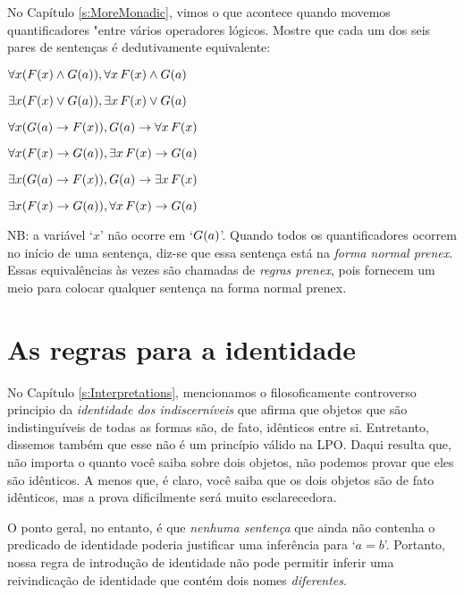 \problempart
No Capítulo \ref{s:MoreMonadic}, vimos o que acontece quando movemos quantificadores "entre  v\'arios operadores l\'ogicos. Mostre que cada um dos seis pares de senten\c cas \'e dedutivamente equivalente:
\begin{earg}
\item $\forall x(\mathord{F}(x) \wedge \mathord{G}(a)), \forall x\,\mathord{F}(x) \wedge \mathord{G}(a)$
\item $\exists x(\mathord{F}(x) \vee \mathord{G}(a)), \exists x\,\mathord{F}(x) \vee \mathord{G}(a)$
\item $\forall x(\mathord{G}(a) \rightarrow \mathord{F}(x)), \mathord{G}(a) \rightarrow \forall x\,\mathord{F}(x)$
\item $\forall x(\mathord{F}(x) \rightarrow \mathord{G}(a)), \exists x\,\mathord{F}(x) \rightarrow \mathord{G}(a)$
\item $\exists x(\mathord{G}(a) \rightarrow \mathord{F}(x)), \mathord{G}(a) \rightarrow \exists x\,\mathord{F}(x)$
\item $\exists x(\mathord{F}(x) \rightarrow \mathord{G}(a)), \forall x\,\mathord{F}(x) \rightarrow \mathord{G}(a)$
\end{earg}
NB: a vari\'avel `$x$'  n\~ao ocorre em `$\mathord{G}(a)$'. Quando todos os quantificadores ocorrem no in\'icio de uma senten\c ca, diz-se que essa senten\c ca est\'a na  \emph{forma normal prenex}. Essas equival\^encias \`as vezes s\~ao chamadas de  \emph{regras prenex}, pois fornecem um meio para colocar qualquer senten\c ca na forma normal prenex.


\chapter{As regras para a identidade}
 No Capítulo  \ref{s:Interpretations},  mencionamos o filosoficamente controverso   principio da \emph{identidade dos indiscern\'iveis} que afirma que objetos que s\~ao indistingu\'iveis de todas as formas s\~ao, de fato, id\^enticos entre si. Entretanto, dissemos tamb\'em que esse n\~ao \'e um princ\'ipio v\'alido na LPO.  Daqui resulta que, n\~ao importa o quanto voc\^e saiba sobre dois objetos, n\~ao podemos provar que eles s\~ao id\^enticos. A menos que, \'e claro, voc\^e saiba que os dois objetos s\~ao de fato id\^enticos, mas a prova dificilmente ser\'a muito esclarecedora.

 O ponto geral, no entanto, \'e que \emph{nenhuma senten\c ca} que ainda n\~ao contenha o predicado de identidade poderia justificar uma infer\^encia para `$a=b$'. Portanto, nossa regra de introdu\c c\~ao de identidade n\~ao pode permitir inferir uma reivindica\c c\~ao de identidade que cont\'em dois nomes  \emph{diferentes}.

